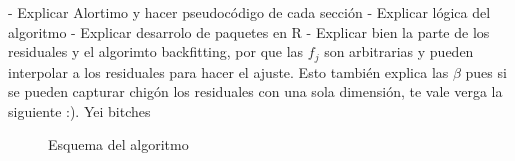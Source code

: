 \documentclass[../Main/Main.tex]{subfiles}
\begin{document}
- Explicar Alortimo y hacer pseudocódigo de cada sección
- Explicar lógica del algoritmo
- Explicar desarrolo de paquetes en R
- Explicar bien la parte de los residuales y el algorimto backfitting, por que las $f_j$ son arbitrarias y pueden interpolar a los residuales para hacer el ajuste. Esto también explica las $\beta$ pues si se pueden capturar chigón los residuales con una sola dimensión, te vale verga la siguiente :). Yei bitches

\begin{figure}[h]
\centering
{}
\caption{Esquema del algoritmo}
\label{fig:DiagramaAlgoritmo}
\end{figure}
\end{document}
